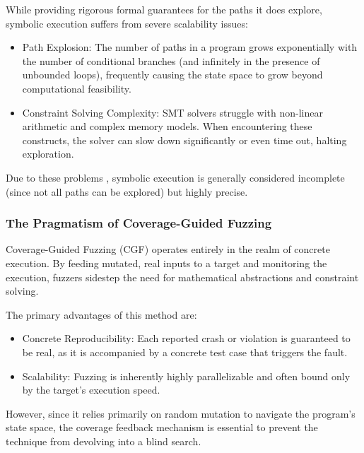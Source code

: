 
While providing rigorous formal guarantees for the paths it does explore, symbolic execution suffers from severe scalability issues: 
\begin{itemize}
    \item Path Explosion: The number of paths in a program grows exponentially with the number of conditional branches (and infinitely in the presence of unbounded loops), frequently causing the state space to grow beyond computational feasibility.

   \item Constraint Solving Complexity: SMT solvers struggle with non-linear arithmetic and complex memory models. When encountering these constructs, the solver can slow down significantly or even time out, halting exploration.
\end{itemize}
Due to these problems \cite{baldoni2018survey}, symbolic execution is generally considered incomplete (since not all paths can be explored) but highly precise.

\subsubsection{The Pragmatism of Coverage-Guided Fuzzing}

Coverage-Guided Fuzzing (CGF) operates entirely in the realm of concrete execution. By feeding mutated, real inputs to a target and monitoring the execution, fuzzers sidestep the need for mathematical abstractions and constraint solving.

The primary advantages of this method are:
\begin{itemize}
    \item Concrete Reproducibility: Each reported crash or violation is guaranteed to be real, as it is accompanied by a concrete test case that triggers the fault.

    \item Scalability: Fuzzing is inherently highly parallelizable and often bound only by the target's execution speed.
\end{itemize}
However, since it relies primarily on random mutation to navigate the program's state space, the coverage feedback mechanism is essential to prevent the technique from devolving into a blind search.



